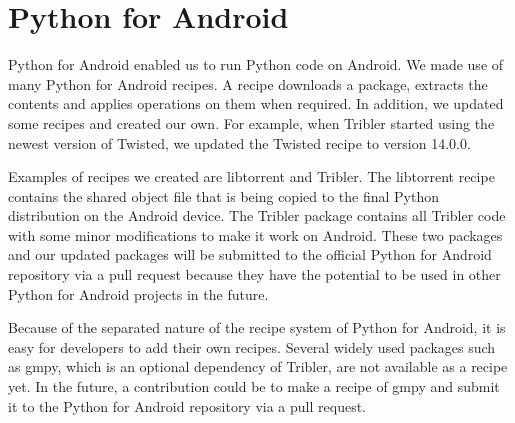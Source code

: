 \section{Python for Android}
\label{sec:pythonforandroid}
	Python for Android enabled us to run Python code on Android. We made use of many Python for Android recipes. A recipe downloads a package, extracts the contents and applies operations on them when required. In addition, we updated some recipes and created our own. For example, when Tribler started using the newest version of Twisted, we updated the Twisted recipe to version 14.0.0.
	
	Examples of recipes we created are libtorrent and Tribler. The libtorrent recipe contains the shared object file that is being copied to the final Python distribution on the Android device. The Tribler package contains all Tribler code with some minor modifications to make it work on Android. These two packages and our updated packages will be submitted to the official Python for Android repository via a pull request because they have the potential to be used in other Python for Android projects in the future.
	
	Because of the separated nature of the recipe system of Python for Android, it is easy for developers to add their own recipes. Several widely used packages such as gmpy, which is an optional dependency of Tribler, are not available as a recipe yet. In the future, a contribution could be to make a recipe of gmpy and submit it to the Python for Android repository via a pull request.